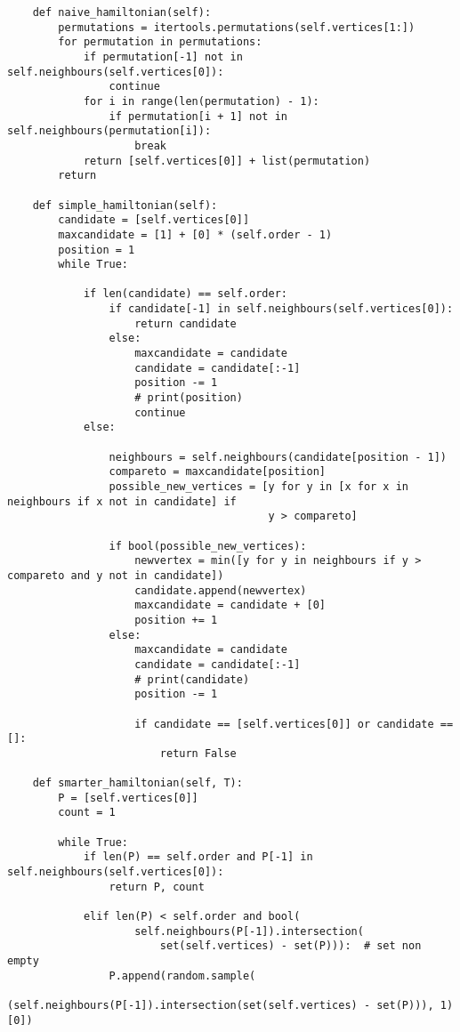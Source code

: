 \documentclass[10pt,a4paper]{report}
\begin{document}
\begin{verbatim}
    def naive_hamiltonian(self):
        permutations = itertools.permutations(self.vertices[1:])
        for permutation in permutations:
            if permutation[-1] not in self.neighbours(self.vertices[0]):
                continue
            for i in range(len(permutation) - 1):
                if permutation[i + 1] not in self.neighbours(permutation[i]):
                    break
            return [self.vertices[0]] + list(permutation)
        return

    def simple_hamiltonian(self):
        candidate = [self.vertices[0]]
        maxcandidate = [1] + [0] * (self.order - 1)
        position = 1
        while True:

            if len(candidate) == self.order:
                if candidate[-1] in self.neighbours(self.vertices[0]):
                    return candidate
                else:
                    maxcandidate = candidate
                    candidate = candidate[:-1]
                    position -= 1
                    # print(position)
                    continue
            else:

                neighbours = self.neighbours(candidate[position - 1])
                compareto = maxcandidate[position]
                possible_new_vertices = [y for y in [x for x in neighbours if x not in candidate] if
                                         y > compareto]

                if bool(possible_new_vertices):
                    newvertex = min([y for y in neighbours if y > compareto and y not in candidate])
                    candidate.append(newvertex)
                    maxcandidate = candidate + [0]
                    position += 1
                else:
                    maxcandidate = candidate
                    candidate = candidate[:-1]
                    # print(candidate)
                    position -= 1

                    if candidate == [self.vertices[0]] or candidate == []:
                        return False

    def smarter_hamiltonian(self, T):
        P = [self.vertices[0]]
        count = 1

        while True:
            if len(P) == self.order and P[-1] in self.neighbours(self.vertices[0]):
                return P, count

            elif len(P) < self.order and bool(
                    self.neighbours(P[-1]).intersection(
                        set(self.vertices) - set(P))):  # set non empty
                P.append(random.sample(
                    (self.neighbours(P[-1]).intersection(set(self.vertices) - set(P))), 1)[0])


\end{verbatim}
\end{document}
